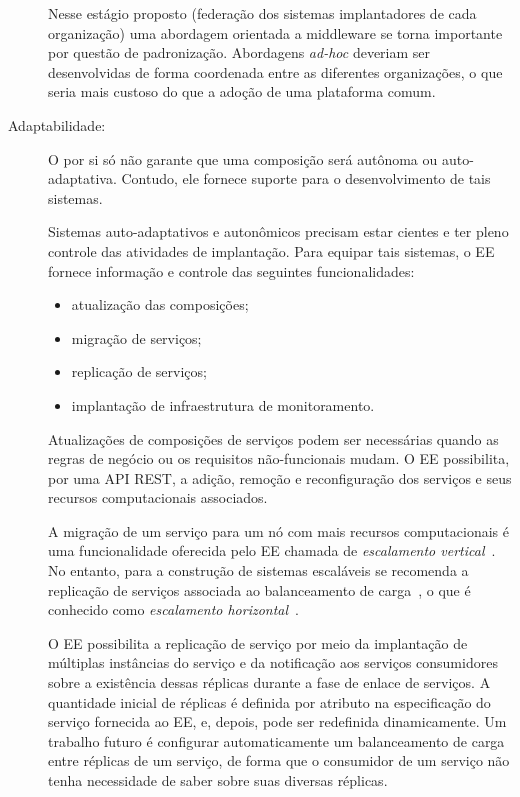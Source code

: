 \begin{description}
Nesse estágio proposto (federação dos sistemas implantadores de cada organização) uma abordagem
orientada a middleware se torna importante por questão de padronização.
Abordagens \emph{ad-hoc} deveriam ser desenvolvidas de forma coordenada entre as diferentes organizações,
o que seria mais custoso do que a adoção de uma plataforma comum.

\item [Adaptabilidade:]

O \ee por si só não garante que uma composição será autônoma ou auto-adaptativa.
Contudo, ele fornece suporte para o desenvolvimento de tais sistemas.

Sistemas auto-adaptativos e autonômicos precisam estar cientes
e ter pleno controle das atividades de implantação.
Para equipar tais sistemas, o EE fornece informação e controle
das seguintes funcionalidades:

\begin{itemize}
\item atualização das composições;
\item migração de serviços;
\item replicação de serviços;
\item implantação de infraestrutura de monitoramento.
\end{itemize}

Atualizações de composições de serviços podem ser necessárias quando
as regras de negócio ou os requisitos não-funcionais mudam.
O EE possibilita, por uma API REST, a adição, remoção e reconfiguração dos serviços
e seus recursos computacionais associados.

A migração de um serviço para um nó com mais recursos computacionais
é uma funcionalidade oferecida pelo EE chamada de \emph{escalamento vertical}~\cite{Pritchett2008Base}.
No entanto, para a construção de sistemas escaláveis se recomenda 
a replicação de serviços associada ao balanceamento de carga~\cite{Amazon2012Practices},
o que é conhecido como \emph{escalamento horizontal}~\cite{Pritchett2008Base}.

O EE possibilita a replicação de serviço por meio da implantação de
múltiplas instâncias do serviço e da notificação aos serviços consumidores
sobre a existência dessas réplicas durante a fase de enlace de serviços.
A quantidade inicial de réplicas é definida por atributo na especificação
do serviço fornecida ao EE, e, depois, pode ser redefinida dinamicamente.
Um trabalho futuro é configurar automaticamente um balanceamento de carga
entre réplicas de um serviço, de forma que o consumidor de um serviço
não tenha necessidade de saber sobre suas diversas réplicas.


\end{description}
